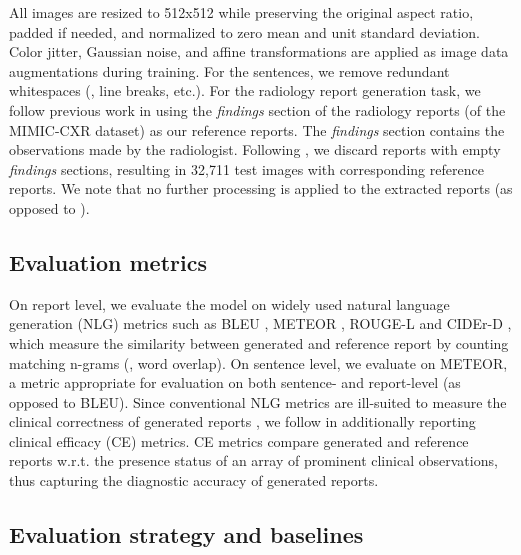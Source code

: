 \documentclass[10pt,twocolumn,letterpaper]{article}
\begin{document}
All images are resized to 512x512 while preserving the original aspect ratio, padded if needed, and normalized to zero mean and unit standard deviation. Color jitter, Gaussian noise, and affine transformations are applied as image data augmentations during training. For the sentences, we remove redundant whitespaces (\ie, line breaks, etc.). For the radiology report generation task, we follow previous work \cite{liu2019clinically, boag2020baselines, miura2021improving, nicolson2022improving} in using the \emph{findings} section of the radiology reports (of the MIMIC-CXR dataset) as our reference reports. The \emph{findings} section contains the observations made by the radiologist. Following \cite{miura2021improving, nicolson2022improving}, we discard reports with empty \emph{findings} sections, resulting in 32,711 test images with corresponding reference reports. We note that no further processing is applied to the extracted reports (as opposed to \eg \cite{nicolson2022improving}).

\subsection{Evaluation metrics}
On report level, we evaluate the model on widely used natural language generation (NLG) metrics such as BLEU \cite{papineni2002bleu}, METEOR \cite{banerjee2005meteor}, ROUGE-L \cite{lin2004rouge} and CIDEr-D \cite{vedantam2015cider}, which measure the similarity between generated and reference report by counting matching n-grams (\ie, word overlap). On sentence level, we evaluate on METEOR, a metric appropriate for evaluation on both sentence- and report-level (as opposed to \eg BLEU). Since conventional NLG metrics are ill-suited to measure the clinical correctness of generated reports \cite{boag2020baselines, liu2019clinically, pino2020inspecting}, we follow \cite{liu2019clinically, chen2020generating, miura2021improving, nicolson2022improving} in additionally reporting clinical efficacy (CE) metrics. CE metrics compare generated and reference reports w.r.t. the presence status of an array of prominent clinical observations, thus capturing the diagnostic accuracy of generated reports.

\subsection{Evaluation strategy and baselines}
\end{document}
